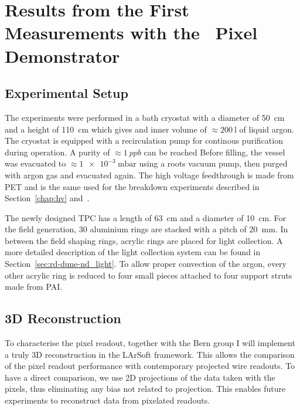 \chapter{Results from the First Measurements with the \AC\ Pixel Demonstrator\label{chap:viper}}


\section{Experimental Setup\label{sec:viper_setup}}
The experiments were performed in a bath cryostat with a diameter of \SI{50}{\centi\metre} and a height of \SI{110}{\centi\metre} which gives and inner volume of $\approx \SI{200}{\litre}$ of liquid argon.
The cryostat is equipped with a recirculation pump for continous purification during operation.
A purity of $\approx \SI{1}{ppb}$ can be reached
Before filling, the vessel was evacuated to $\approx \SI{1e-3}{\milli\bar}$ using a roots vacuum pump, then purged with argon gas and evacuated again.
The high voltage feedthrough is made from PET and is the same used for the breakdown experiments described in Section~\ref{chap:hv} and~\cite{breakdown_14, breakdown_16}.

The newly designed TPC has a length of \SI{63}{\centi\metre} and a diameter of \SI{10}{\centi\metre}. %
For the field generation, \num{30} aluminium rings are stacked with a pitch of \SI{20}{\milli\metre}.
In between the field shaping rings, acrylic rings are placed for light collection.
A more detailed description of the light collection system can be found in Section~\ref{sec:rd-dune-nd_light}.
To allow proper convection of the argon, every other acrylic ring is reduced to four small pieces attached to four support struts made from PAI.


\section{3D Reconstruction\label{sec:viper_reco}}
To characterise the pixel readout, together with the Bern group I will implement a truly 3D reconstruction in the LArSoft framework.
This allows the comparison of the pixel readout performance with contemporary projected wire readouts.
To have a direct comparison, we use 2D projections of the data taken with the pixels, thus eliminating any bias not related to projection.
This enables future experiments to reconstruct data from pixelated readouts.